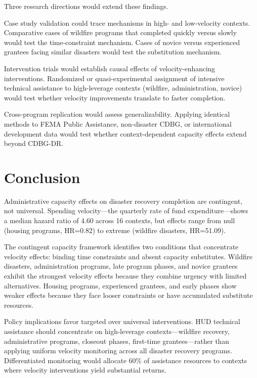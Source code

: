 \documentclass[
  12pt,
  letterpaper,
]{article}
\begin{document}
Three research directions would extend these findings.

Case study validation could trace mechanisms in high- and low-velocity
contexts. Comparative cases of wildfire programs that completed quickly
versus slowly would test the time-constraint mechanism. Cases of novice
versus experienced grantees facing similar disasters would test the
substitution mechanism.

Intervention trials would establish causal effects of velocity-enhancing
interventions. Randomized or quasi-experimental assignment of intensive
technical assistance to high-leverage contexts (wildfire,
administration, novice) would test whether velocity improvements
translate to faster completion.

Cross-program replication would assess generalizability. Applying
identical methods to FEMA Public Assistance, non-disaster CDBG, or
international development data would test whether context-dependent
capacity effects extend beyond CDBG-DR.

\section{Conclusion}\label{conclusion}

Administrative capacity effects on disaster recovery completion are
contingent, not universal. Spending velocity---the quarterly rate of
fund expenditure---shows a median hazard ratio of 4.60 across 16
contexts, but effects range from null (housing programs, HR=0.82) to
extreme (wildfire disasters, HR=51.09).

The contingent capacity framework identifies two conditions that
concentrate velocity effects: binding time constraints and absent
capacity substitutes. Wildfire disasters, administration programs, late
program phases, and novice grantees exhibit the strongest velocity
effects because they combine urgency with limited alternatives. Housing
programs, experienced grantees, and early phases show weaker effects
because they face looser constraints or have accumulated substitute
resources.

Policy implications favor targeted over universal interventions. HUD
technical assistance should concentrate on high-leverage
contexts---wildfire recovery, administrative programs, closeout phases,
first-time grantees---rather than applying uniform velocity monitoring
across all disaster recovery programs. Differentiated monitoring would
allocate 60\% of assistance resources to contexts where velocity
interventions yield substantial returns.
\end{document}
